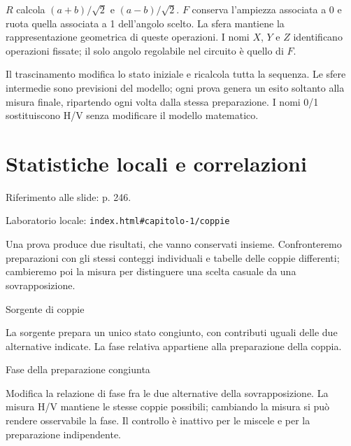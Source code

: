 \(R\) calcola \((a+b)/\sqrt{2}\) e \((a- b)/\sqrt{2}\). \(F\) conserva l'ampiezza associata a 0 e ruota quella associata a 1 dell'angolo scelto. La sfera mantiene la rappresentazione geometrica di queste operazioni. I nomi \(X\), \(Y\) e \(Z\) identificano operazioni fissate; il solo angolo regolabile nel circuito è quello di \(F\).\par

Il trascinamento modifica lo stato iniziale e ricalcola tutta la sequenza. Le sfere intermedie sono previsioni del modello; ogni prova genera un esito soltanto alla misura finale, ripartendo ogni volta dalla stessa preparazione. I nomi 0/1 sostituiscono H/V senza modificare il modello matematico.\par




\Needspace{.43\textheight}
\section{Statistiche locali e correlazioni}
\label{c1-coppie}

{\sffamily\small\color{Ink!70} Riferimento alle slide: p. 246.\par}

{\sffamily\small\color{Ink!70} Laboratorio locale: \nolinkurl{index.html#capitolo-1/coppie}\par}

Una prova produce due risultati, che vanno conservati insieme. Confronteremo preparazioni con gli stessi conteggi individuali e tabelle delle coppie differenti; cambieremo poi la misura per distinguere una scelta casuale da una sovrapposizione.\par



Sorgente di coppie\par

La sorgente prepara un unico stato congiunto, con contributi uguali delle due alternative indicate. La fase relativa appartiene alla preparazione della coppia.\par

Fase della preparazione congiunta\par

Modifica la relazione di fase fra le due alternative della sovrapposizione. La misura H/V mantiene le stesse coppie possibili; cambiando la misura si può rendere osservabile la fase. Il controllo è inattivo per le miscele e per la preparazione indipendente.\par

